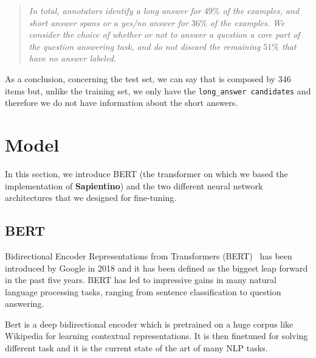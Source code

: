 \documentclass[10pt,hidelinks]{article}
\newcommand\nomefico{\textbf{Sapientino}}
\begin{document}
\blockquote{\it In total, annotators identify a long answer for $49\%$ of the examples, and short answer spans or a yes/no answer for $36\%$ of the examples. We consider the choice of whether or not to answer a question a core part of the question answering task, and do not discard the remaining $51\%$ that have no answer labeled.\cite{kwiatowski}}

As a conclusion, concerning the test set, we can say that is composed by $346$ items but, unlike the training set,  we only have the {\tt long\_answer candidates} and therefore we do not have information about the short answers.

\section{Model}\label{sec:model}
In this section, we introduce BERT (the transformer on which we based the implementation of \nomefico) and the two different neural network architectures that we designed for fine-tuning.

\subsection{BERT}\label{subsec:bert}
Bidirectional Encoder Representations from Transformers (BERT)~\cite{devlin2018bert}  has been introduced by Google in 2018 and it has been defined as the biggest leap forward in the past five years. BERT has led to impressive gains in many natural language processing tasks, ranging from sentence classification to question answering.

Bert is a deep bidirectional encoder which is pretrained on a huge corpus like Wikipedia for learning contextual representations. It is then finetuned for solving different task and it is the current state of the art of many NLP tasks.

\end{document}
